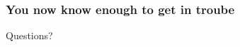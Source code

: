 \documentclass{beamer}
\begin{document}
\begin{frame}
\frametitle{You now know enough to get in troube}

\begin{center}
\alert{\huge{Questions?}}

\vspace{1cm}


\end{center}

\end{frame}
\end{document}
